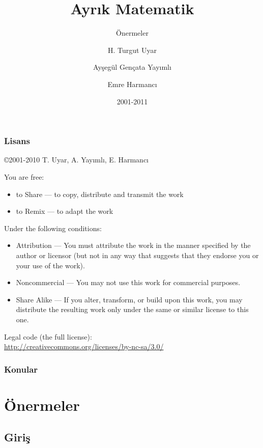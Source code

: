 \documentclass[dvipsnames]{beamer}
\title{Ayrık Matematik}
\subtitle{Önermeler}
\author{H. Turgut Uyar \and Ayşegül Gençata Yayımlı \and Emre Harmancı}
\date{2001-2011}
\theoremstyle{definition}
\theoremstyle{example}
\theoremstyle{plain}
\begin{document}
\begin{frame}
  \titlepage
\end{frame}

\begin{frame}
  \frametitle{Lisans}

  \hfill
  \copyright 2001-2010 T. Uyar, A. Yayımlı, E. Harmancı

  \vfill
  \begin{tiny}
    You are free:
    \begin{itemize}
      \item to Share — to copy, distribute and transmit the work
      \item to Remix — to adapt the work
    \end{itemize}

    Under the following conditions:
    \begin{itemize}
      \item Attribution — You must attribute the work in the manner specified by
        the author or licensor (but not in any way that suggests that they
        endorse you or your use of the work).

      \item Noncommercial — You may not use this work for commercial purposes.

      \item Share Alike — If you alter, transform, or build upon this work, you
        may distribute the resulting work only under the same or similar license
        to this one.
    \end{itemize}
  \end{tiny}

  \vfill
  Legal code (the full license):\\
  \url{http://creativecommons.org/licenses/by-nc-sa/3.0/}
\end{frame}

\begin{frame}
  \frametitle{Konular}
  \tableofcontents
\end{frame}

\section{Önermeler}

\subsection{Giriş}
\end{document}
